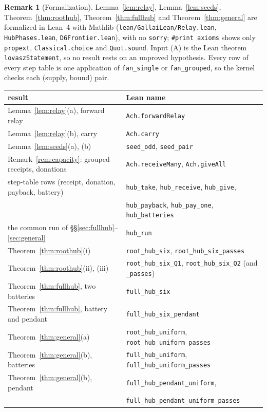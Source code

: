 \documentclass[11pt]{amsart}
\theoremstyle{definition}
\newtheorem{remark}[theorem]{Remark}
\begin{document}
\begin{remark}[Formalization]\label{rem:lean}
Lemma~\ref{lem:relay}, Lemma~\ref{lem:seeds}, Theorem~\ref{thm:roothub},
Theorem~\ref{thm:fullhub} and Theorem~\ref{thm:general} are formalized in Lean~4 with Mathlib
(\texttt{lean/GallaiLean/Relay.lean}, \texttt{HubPhases.lean}, \texttt{D6Frontier.lean}), with no
\texttt{sorry}; \texttt{\#print axioms} shows only \texttt{propext}, \texttt{Classical.choice} and
\texttt{Quot.sound}. Input (A) is the Lean theorem \texttt{lovaszStatement}, so no result rests on
an unproved hypothesis. Every row of every step table is one application of \texttt{fan\_single}
or \texttt{fan\_grouped}, so the kernel checks each (supply, bound) pair.

\smallskip
\begin{center}\footnotesize
\begin{tabular}{ll}
\toprule
result & Lean name\\
\midrule
Lemma~\ref{lem:relay}(a), forward relay & \texttt{Ach.forwardRelay}\\
Lemma~\ref{lem:relay}(b), carry & \texttt{Ach.carry}\\
Lemma~\ref{lem:seeds}(a), (b) & \texttt{seed\_odd}, \texttt{seed\_pair}\\
Remark~\ref{rem:capacity}: grouped receipts, donations & \texttt{Ach.receiveMany}, \texttt{Ach.giveAll}\\
step-table rows (receipt, donation, payback, battery) & \texttt{hub\_take}, \texttt{hub\_receive}, \texttt{hub\_give},\\
 & \texttt{hub\_payback}, \texttt{hub\_pay\_one}, \texttt{hub\_batteries}\\
the common run of \S\S\ref{sec:fullhub}--\ref{sec:general} & \texttt{hub\_run}\\
Theorem~\ref{thm:roothub}(i) & \texttt{root\_hub\_six}, \texttt{root\_hub\_six\_passes}\\
Theorem~\ref{thm:roothub}(ii), (iii) & \texttt{root\_hub\_six\_Q1}, \texttt{root\_hub\_six\_Q2} (and \texttt{\_passes})\\
Theorem~\ref{thm:fullhub}, two batteries & \texttt{full\_hub\_six}\\
Theorem~\ref{thm:fullhub}, battery and pendant & \texttt{full\_hub\_six\_pendant}\\
Theorem~\ref{thm:general}(a) & \texttt{root\_hub\_uniform}, \texttt{root\_hub\_uniform\_passes}\\
Theorem~\ref{thm:general}(b), batteries & \texttt{full\_hub\_uniform}, \texttt{full\_hub\_uniform\_passes}\\
Theorem~\ref{thm:general}(b), pendant & \texttt{full\_hub\_pendant\_uniform},\\
 & \texttt{full\_hub\_pendant\_uniform\_passes}\\
\bottomrule
\end{tabular}
\end{center}
\smallskip


\end{remark}
\end{document}
